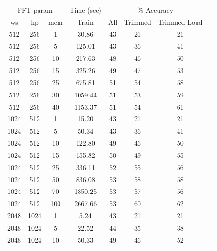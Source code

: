 \documentclass[12pt,oneside]{book}
\begin{document}
\begin{table}
\begin{tabular}{|c|c|c|c|c|c|c|c}
\hline
\multicolumn{3}{|c|}{FFT param} & \multicolumn{1}{c|}{Time (sec)} & \multicolumn{3}{c|}{\% Accuracy} \\
\hhline{|-|-|-|-|-|-|-|-|}
ws & hp & mem & Train & All & Trimmed & Trimmed Loud \\
\hhline{|=|=|=|=|=|=|=|=|}
512 & 256 & 1      &        30.86  &    43   &  21  &  21 \\
512 & 256 & 5      &       125.01  &    43   &  36  &  41 \\
512 & 256 & 10     &       217.63  &    48   &  46  &  50 \\
512 & 256 & 15     &       325.26  &    49   &  47  &  53 \\
512 & 256 & 25     &       675.81  &    51   &  54  &  58 \\
512 & 256 & 30     &      1059.44  &    51   &  53  &  59 \\
512 & 256 & 40     &      1153.37  &    51   &  54  &  61 \\
\hline
1024 & 512 & 1     &        15.20  &    43  &  21  &  21 \\
1024 & 512 & 5     &        50.34  &    43  &  36  &  41 \\
1024 & 512 & 10    &       122.80  &    49  &  46  &  50 \\
1024 & 512 & 15    &       155.82  &    50  &  49  &  55 \\
1024 & 512 & 25    &       336.11  &    52  &  55  &  56 \\
1024 & 512 & 50    &       836.08  &    53  &  58  &  58 \\
1024 & 512 & 70    &      1850.25  &    53  &  57  &  56 \\
1024 & 512 & 100   &      2667.66  &    53  &  60  &  62 \\
\hline
2048 & 1024 & 1    &         5.24  &    43 &  21  &  21 \\
2048 & 1024 & 5    &        22.52  &    44 &  35  &  38 \\
2048 & 1024 & 10   &        50.33  &    49 &  46  &  52 \\

\end{tabular}
\end{table}
\end{document}
